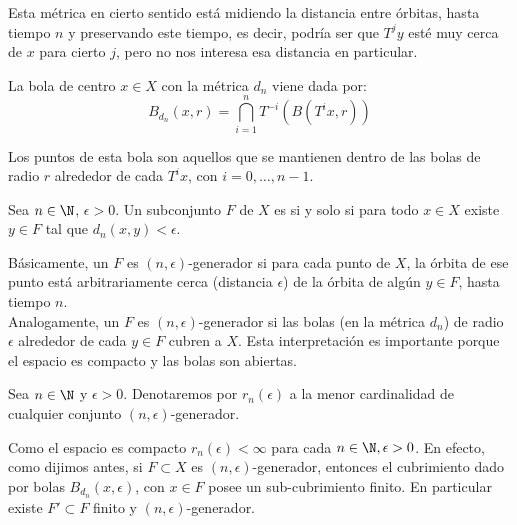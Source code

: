 \documentclass[	docname= Sistemas\ Din\'amicos,
				finished=1,
				semester=1,
				year=2017,
				professor=Godofredo\ Iommi,
				sigla=MAT2565]{apunte}
\begin{document}
\begin{obs} Esta métrica en cierto sentido está midiendo la distancia entre órbitas, hasta tiempo $n$ y preservando este tiempo, es decir, podría ser que $T^{j}y$ esté muy cerca de $x$ para cierto $j$, pero no nos interesa esa distancia en particular.
\end{obs}

\begin{obs} La bola de centro $x \in X$ con la métrica $d_{n}$ viene dada por:
	$$B_{d_{n}}(x,r) = \bigcap_{i=1}^{n} T^{-i}(B(T^{i}x,r))$$

Los puntos de esta bola son aquellos que se mantienen dentro de las bolas de radio $r$ alrededor de cada $T^{i}x$, con $i = 0, \ldots, n-1$. 
\end{obs}

\begin{defn} Sea $n \in \N$, $\epsilon > 0$. Un subconjunto $F$ de $X$ es  si y solo si para todo $x \in X$ existe $y \in F$ tal que $d_{n}(x,y) < \epsilon$.
\end{defn}

\begin{obsd} Básicamente, un $F$ es $(n,\epsilon)$-generador si para cada punto de $X$, la órbita de ese punto está arbitrariamente cerca (distancia $\epsilon$) de la órbita de algún $y \in F$, hasta tiempo $n$.	\\

Analogamente, un $F$ es $(n,\epsilon)$-generador si las bolas (en la métrica $d_{n}$) de radio $\epsilon$ alrededor de cada $y \in F$ cubren a $X$. Esta interpretación es importante porque el espacio es compacto y las bolas son abiertas.
\end{obsd}

\begin{defn} Sea $n \in \N$ y $\epsilon > 0$. Denotaremos por $r_{n}(\epsilon)$ a la menor cardinalidad de cualquier conjunto $(n,\epsilon)$-generador.
\end{defn}

\begin{obsd} Como el espacio es compacto $r_{n}(\epsilon) < \infty$ para cada $n \in \N, \epsilon > 0$. En efecto, como dijimos antes, si $F \subset X$ es $(n,\epsilon)$-generador, entonces el cubrimiento dado por bolas $B_{d_{n}}(x,\epsilon)$, con $x \in F$ posee un sub-cubrimiento finito. En particular existe $F' \subset F$ finito y $(n,\epsilon)$-generador.
\end{obsd}
\end{document}
